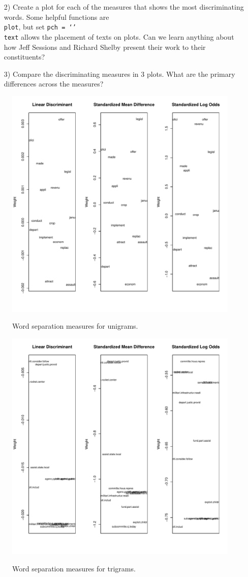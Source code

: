 \documentclass[12pt,letterpaper]{article}
\begin{document}


\begin{itemize}
\item[2)] Create a plot for each of the measures that shows the most discriminating words.  Some helpful functions are \\
{\tt plot}, but set {\tt pch = `'} \\
{\tt text}  allows the placement of texts on plots. Can we learn anything about how Jeff Sessions and Richard Shelby present their work to their constituents?\\
\end{itemize}



\begin{itemize}
\item[3)] Compare the discriminating measures in 3 plots.  What are the primary differences across the measures?
\end{itemize}

\begin{figure}[H]
  \caption{\footnotesize{Word separation measures for unigrams.}}
  \centering
   \includegraphics[width=.6\linewidth]{HW2wordDistanceUnigrams.pdf}\\
\end{figure}

\begin{figure}[H]
  \caption{\footnotesize{Word separation measures for trigrams.}}
  \centering
   \includegraphics[width=.6\linewidth]{HW2wordDistanceTrigrams.pdf}\\
\end{figure}
\end{document}
